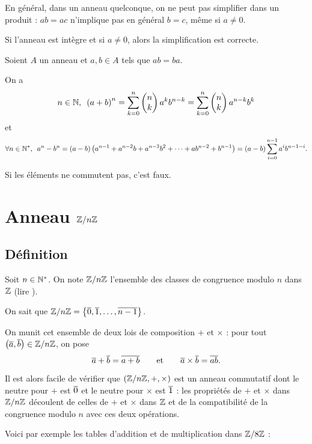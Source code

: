 \begin{rem}
En général, dans un anneau quelconque, on ne peut pas simplifier dans un produit : \(ab=ac\) n'implique pas en général \(b=c\), même si \(a\not=0\).

Si l'anneau est intègre et si \(a\not=0\), alors la simplification est correcte.
\end{rem}

\begin{prop}
Soient \(A\) un anneau et \(a,b\in A\) tels que \(ab=ba\).

On a \[\quantifs{n\in\N}\paren{a+b}^n=\sum_{k=0}^n\binom{k}{n}a^kb^{n-k}=\sum_{k=0}^n\binom{k}{n}a^{n-k}b^k\] et \[\quantifs{\forall n\in\Ns}a^n-b^n=\paren{a-b}\paren{a^{n-1}+a^{n-2}b+a^{n-3}b^2+\dots+ab^{n-2}+b^{n-1}}=\paren{a-b}\sum_{i=0}^{n-1}a^ib^{n-1-i}.\]
\end{prop}

\begin{rem}
Si les éléments ne commutent pas, c'est faux.
\end{rem}

\section{Anneau \(\mathbb{Z}/n\mathbb{Z}\)}

\subsection{Définition}

Soit \(n\in\mathbb{N}^*\). On note \(\mathbb{Z}/n\mathbb{Z}\) l'ensemble des classes de congruence modulo \(n\) dans \(\mathbb{Z}\) (lire ).

On sait que \(\mathbb{Z}/n\mathbb{Z}=\left\lbrace\overline{0},\overline{1},\dots,\overline{n-1}\right\rbrace\).

On munit cet ensemble de deux lois de composition \(+\) et \(\times\) : pour tout \(\left(\overline{a},\overline{b}\right)\in\mathbb{Z}/n\mathbb{Z}\), on pose \[\overline{a}+\overline{b}=\overline{a+b}\qquad\text{et}\qquad\overline{a}\times\overline{b}=\overline{ab}.\]

Il est alors facile de vérifier que \(\anneau{\znz{n}}[+][\times]\) est un anneau commutatif dont le neutre pour \(+\) est \(\overline{0}\) et le neutre pour \(\times\) est \(\overline{1}\) : les propriétés de \(+\) et \(\times\) dans \(\mathbb{Z}/n\mathbb{Z}\) découlent de celles de \(+\) et \(\times\) dans \(\mathbb{Z}\) et de la compatibilité de la congruence modulo \(n\) avec ces deux opérations.

Voici par exemple les tables d'addition et de multiplication dans \(\mathbb{Z}/8\mathbb{Z}\) :

